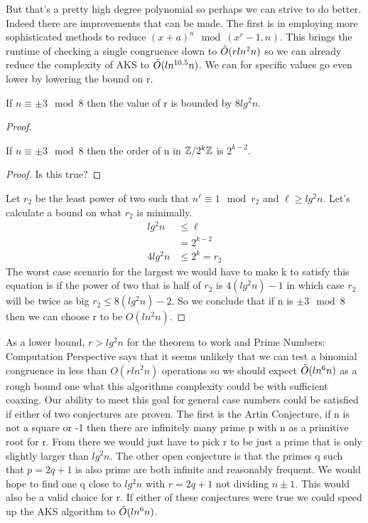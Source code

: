 \documentclass{article}
\begin{document}
But that's a pretty high degree polynomial so perhaps we can strive to do better.  Indeed there are improvements that can be made. The first is in employing more sophisticated methods to reduce $( x + a)^n \mod (x^r - 1, n)$. This brings the runtime of checking a single congruence down to $\tilde{O}( r ln^2 n)$ so we can already reduce the complexity of AKS to $\tilde{O}( ln^{10.5} n)$.  We can for specific values go even lower by lowering the bound on r. 
\begin{theorem}
    If $n \equiv \pm 3 \mod 8$ then the value of r is bounded by $8 lg^2 n$.
\end{theorem}
\begin{proof}
    \begin{lem}
        If $n \equiv \pm 3 \mod 8$ then the order of n in $\mathbb{Z} / 2^k \mathbb{Z}$ is $2^{k-2}$.
    \end{lem}
    \begin{proof}
        Is this true? 
    \end{proof}
    Let $r_2$ be the least power of two such that $n^\ell \equiv 1 \mod r_2$ and $\ell \geq lg^2 n$. Let's calculate a bound on what $r_2$ is minimally. 
    \begin{align}
     lg^2 n &\leq \ell \\
     &= 2^{k-2} \\
     4 lg^2 n &\leq 2^k = r_2 
    \end{align}
    The worst case scenario for the largest we would have to make k to satisfy this equation is if the power of two that is half of $r_2$ is $4 (lg^2 n) - 1$ in which case $r_2$ will be twice as big $r_2 \leq 8 (lg^2 n) -2$. So we conclude that if n is $\pm 3 \mod 8$ then we can choose r to be $O(ln^2 n)$. 
\end{proof}


As a lower bound, $r > lg^2 n$ for the theorem to work and Prime Numbers: Computation Perspective says that it seems unlikely that we can test a binomial congruence in less than $O(r ln^2 n )$ operations so we should expect $\tilde{O}(ln^6 n)$ as a rough bound one what this algorithms complexity could be with sufficient coaxing\cite{crandall2006prime}. Our ability to meet this goal for general case numbers could be satisfied if either of two conjectures are proven. The first is the Artin Conjecture, if n is not a square or -1 then there are infinitely many prime p with n as a primitive root for r. From there we would just have to pick r to be just a prime that is only slightly larger than $lg^2 n$. The other open conjecture is that the primes q such that $p = 2q + 1$ is also prime are both infinite and reasonably frequent. We would hope to find one q close to $lg^2 n $ with $r = 2q + 1$ not dividing $n \pm 1$. This would also be a valid choice for r. If either of these conjectures were true we could speed up the AKS algorithm to $\tilde{O}(ln^6 n )$.
\end{document}
